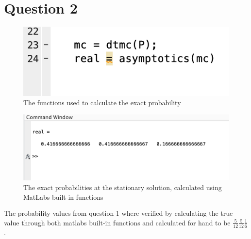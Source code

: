 \documentclass{article}
\begin{document}
\section{Question 2}
\begin{figure}[H]
    \includegraphics[width=\linewidth]{./imgs/2code.png}
    \caption{The functions used to calculate the exact probability}
\end{figure}
\begin{figure}[H]
    \includegraphics[width=\linewidth]{./imgs/2.png}
    \caption{The exact probabilities at the stationary solution, calculated using MatLabs built-in functions}
\end{figure}
The probability values from question 1 where verified by calculating the true value through both matlabs built-in functions and calculated for hand to be $\frac{5}{12} \frac{5}{12} \frac{1}{6}$.
\end{document}
